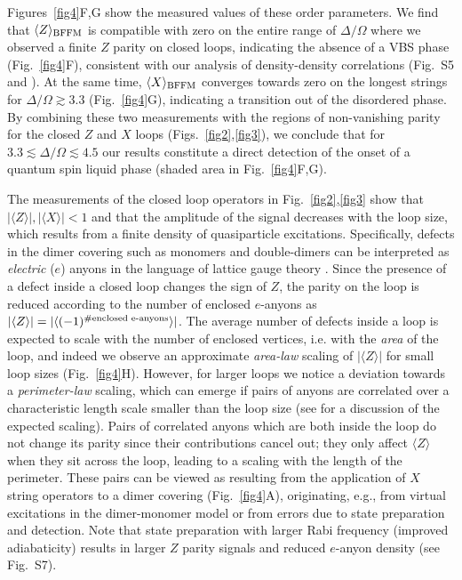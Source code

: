 \documentclass[twocolumn,amssymb,secnumarabic, prl, aps, nofootinbib]{revtex4-1}
\begin{document}
Figures~\ref{fig4}F,G show the measured values of 
these order parameters. 
We find that $\langle Z \rangle_{\textnormal{BFFM}}$
is compatible with zero on the entire range of $\Delta/\Omega$ where we observed a finite $Z$ parity on closed loops, indicating the absence of a VBS phase (Fig.~\ref{fig4}F), consistent with our analysis of density-density correlations (Fig.~S5 and \cite{Supplement}).
At the same time, $\langle X\rangle_{\textnormal{BFFM}}$ converges towards zero on the longest strings for $\Delta/\Omega \gtrsim 3.3$ (Fig.~\ref{fig4}G), indicating a transition out of the disordered phase. By combining these two measurements with the regions of non-vanishing parity for the closed $Z$ and $X$ loops (Figs.~\ref{fig2},\ref{fig3}), we conclude that for $3.3 \lesssim \Delta/\Omega \lesssim 4.5$ our results constitute a direct detection of the onset of a quantum spin liquid phase (shaded area in Fig.~\ref{fig4}F,G). 

The measurements of the closed loop operators in Fig.~\ref{fig2},\ref{fig3} show that $|\langle Z \rangle|, |\langle X \rangle| <1$ and that the amplitude of the signal decreases with the loop size, which results from a finite density of quasiparticle excitations.
Specifically, defects in the dimer covering such as monomers and double-dimers can be interpreted as {\it electric} ($e$) anyons in the language of lattice gauge theory \cite{Ruben2020}.   
Since the presence of a defect inside a closed loop changes the sign of $Z$, the parity on the loop is reduced according to the number of enclosed $e$-anyons as
$|\langle Z \rangle| = |\langle(-1)^{\# \textnormal{enclosed e-anyons}} \rangle|$.
The average number of defects inside a loop is expected to scale with the number of enclosed vertices, i.e. with the {\it area} of the loop, and indeed
we observe an approximate { \it area-law} scaling of $|\langle Z \rangle|$ for small loop sizes (Fig.~\ref{fig4}H).
However, for larger loops we notice a deviation towards a {\it perimeter-law} scaling,
which can emerge if pairs of anyons are correlated over a characteristic length scale smaller than the loop size (see \cite{Supplement} for a discussion of the expected scaling).
Pairs of correlated anyons which are both inside the loop 
do not change its parity since their contributions cancel out; they only affect $\langle Z \rangle$ when they sit across the loop, leading to a scaling with the length of the perimeter. These 
pairs  
can be viewed as resulting from the application of $X$ string operators to a dimer covering (Fig.~\ref{fig4}A), originating, e.g., from  virtual excitations in the dimer-monomer model \cite{Supplement} or from errors due to state preparation and detection. Note that state preparation with larger Rabi frequency (improved adiabaticity) results in larger $Z$ parity signals and reduced $e$-anyon density (see Fig.~S7). 
\end{document}
